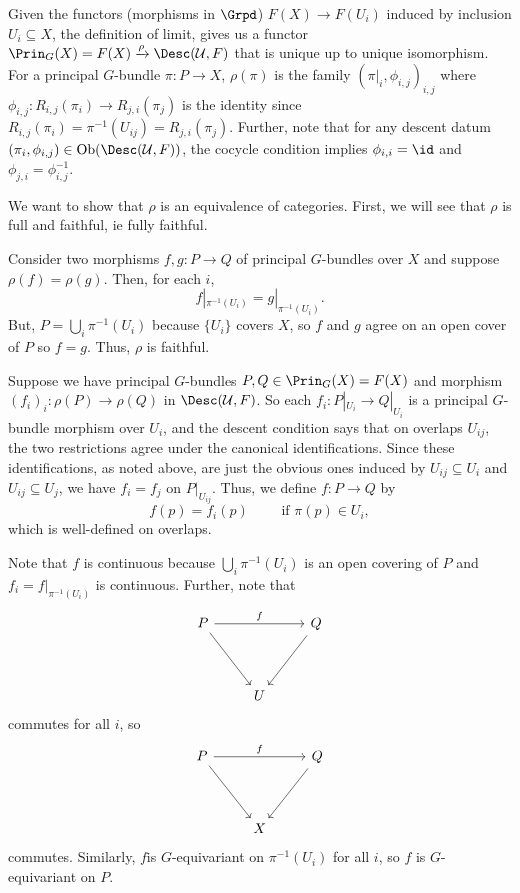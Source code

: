 \begin{example}
Given the functors (morphisms in \( \Grpd \)) \( F(X) \to F(U_i) \) induced by inclusion \( U_i \subseteq X \), the definition of limit, gives us a functor \( \Prin_G(X) = F(X) \xrightarrow{\rho} \Desc(\mathcal{U},F) \) that is unique up to unique isomorphism. For a principal \( G \)-bundle \( \pi: P \to X \), \( \rho(\pi) \) is the family \( (\pi|_{i},\phi_{i,j})_{i,j} \) where \( \phi_{i,j}: R_{i,j}(\pi_i) \to R_{j,i}(\pi_j) \) is the identity since \( R_{i,j}(\pi_i) = \pi^{-1}(U_{ij}) = R_{j,i}(\pi_j) \). Further, note that for any descent datum \((\pi_i,\phi_{i,j}) \in \text{Ob}(\Desc(\mathcal{U}, F))\), the cocycle condition implies \( \phi_{i,i} = \id \) and \( \phi_{j,i} = \phi_{i,j}^{-1} \).

We want to show that \( \rho \) is an equivalence of categories. First, we will see that \( \rho \) is full and faithful, ie fully faithful.

Consider two morphisms \( f,g: P \to Q \) of principal \( G \)-bundles over \( X \) and suppose \( \rho(f) = \rho(g) \). Then, for each \( i \),
\[ f|_{\pi^{-1}(U_i)} = g|_{\pi^{-1}(U_i)}. \]
But, \( P = \bigcup_i \pi^{-1}(U_i) \) because \( \{ U_i \} \) covers \( X \), so \( f \) and \( g \) agree on an open cover of \( P \) so \( f = g \). Thus, \( \rho \) is faithful.

Suppose we have principal \( G \)-bundles \( P,Q \in \Prin_G(X) = F(X) \) and morphism \( (f_i)_i: \rho(P) \to \rho(Q) \) in \( \Desc(\mathcal{U},F) \). So each \( f_i : P|_{U_i} \to Q|_{U_i} \) is a principal \( G \)-bundle morphism over \( U_i \), and the descent condition says that on overlaps \( U_{ij} \), the two restrictions agree under the canonical identifications. Since these identifications, as noted above, are just the obvious ones induced by \( U_{ij} \subseteq U_i \) and \( U_{ij} \subseteq U_j \), we have \( f_i = f_j \) on \( P|_{U_{ij}} \). Thus, we define \( f: P \to Q \) by
\[ f(p) = f_i(p) \qquad \text{ if } \pi(p) \in U_i, \]
which is well-defined on overlaps.

Note that \( f \) is continuous because \( \bigcup_i \pi^{-1}(U_i) \) is an open covering of \( P \) and \( f_i = f|_{\pi^{-1}(U_i)} \) is continuous. Further, note that
\[\begin{tikzcd}
	P && Q \\
	\\
	& U
	\arrow["f", from=1-1, to=1-3]
	\arrow[from=1-1, to=3-2]
	\arrow[from=1-3, to=3-2]
\end{tikzcd}\]
commutes for all \( i \), so
\[\begin{tikzcd}
	P && Q \\
	\\
	& X
	\arrow["f", from=1-1, to=1-3]
	\arrow[from=1-1, to=3-2]
	\arrow[from=1-3, to=3-2]
\end{tikzcd}\]
commutes. Similarly, \( f \)is \( G \)-equivariant on \( \pi^{-1}(U_i) \) for all \( i \), so \( f \) is \( G \)-equivariant on \( P \).


\end{example}
